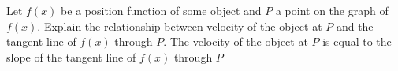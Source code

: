 {Let $f(x)$ be a position function of some object and $P$ a point on the graph of $f(x)$.  Explain the relationship between velocity of the object at $P$ and the tangent line of $f(x)$ through $P$.}
{The velocity of the object at $P$ is equal to the slope of the tangent line of $f(x)$ through $P$}